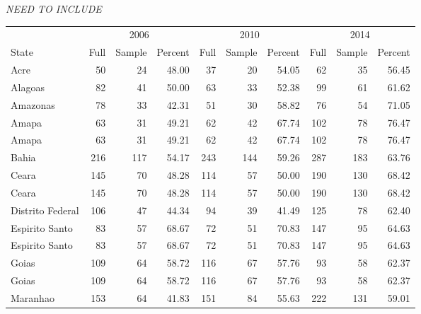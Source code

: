 \documentclass[12pt,english]{article}
\newcommand{\lyxdot}{.}
\numberwithin{equation}{section}
\theoremstyle{plain}
\theoremstyle{remark}
\theoremstyle{plain}
\begin{document}
\emph{NEED TO INCLUDE}

\newpage

\begin{table}[H]
  \centering\begingroup\fontsize{8}{10}\selectfont
  
  \begin{tabular}{lrrrrrrrrr}
  \toprule
  \multicolumn{1}{c}{ } & \multicolumn{3}{c}{2006} & \multicolumn{3}{c}{2010} & \multicolumn{3}{c}{2014} \\
  \cmidrule(l{3pt}r{3pt}){2-4} \cmidrule(l{3pt}r{3pt}){5-7} \cmidrule(l{3pt}r{3pt}){8-10}
  State & Full & Sample & Percent & Full & Sample & Percent & Full & Sample & Percent\\
  \midrule
  Acre & 50 & 24 & 48.00 & 37 & 20 & 54.05 & 62 & 35 & 56.45\\
  Alagoas & 82 & 41 & 50.00 & 63 & 33 & 52.38 & 99 & 61 & 61.62\\
  Amazonas & 78 & 33 & 42.31 & 51 & 30 & 58.82 & 76 & 54 & 71.05\\
  Amapa & 63 & 31 & 49.21 & 62 & 42 & 67.74 & 102 & 78 & 76.47\\
  Amapa & 63 & 31 & 49.21 & 62 & 42 & 67.74 & 102 & 78 & 76.47\\
  \addlinespace
  Bahia & 216 & 117 & 54.17 & 243 & 144 & 59.26 & 287 & 183 & 63.76\\
  Ceara & 145 & 70 & 48.28 & 114 & 57 & 50.00 & 190 & 130 & 68.42\\
  Ceara & 145 & 70 & 48.28 & 114 & 57 & 50.00 & 190 & 130 & 68.42\\
  Distrito Federal & 106 & 47 & 44.34 & 94 & 39 & 41.49 & 125 & 78 & 62.40\\
  Espirito Santo & 83 & 57 & 68.67 & 72 & 51 & 70.83 & 147 & 95 & 64.63\\
  \addlinespace
  Espirito Santo & 83 & 57 & 68.67 & 72 & 51 & 70.83 & 147 & 95 & 64.63\\
  Goias & 109 & 64 & 58.72 & 116 & 67 & 57.76 & 93 & 58 & 62.37\\
  Goias & 109 & 64 & 58.72 & 116 & 67 & 57.76 & 93 & 58 & 62.37\\
  Maranhao & 153 & 64 & 41.83 & 151 & 84 & 55.63 & 222 & 131 & 59.01\\

\end{tabular}
\end{table}
\end{document}
